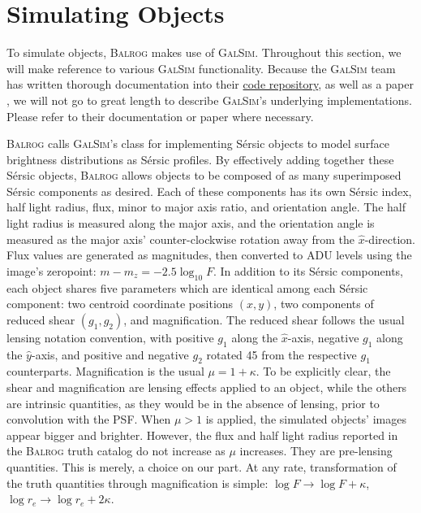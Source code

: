 \documentclass[11pt]{book}
\newcommand{\galsim}{\textsc{GalSim}}
\newcommand{\balrog}{\textsc{Balrog}}
\newcommand{\sersic}{S\'{e}rsic}
\begin{document}


\section{Simulating Objects}
\label{sec:galsim}

To simulate objects, \balrog{} makes use of \galsim{}. 
Throughout this section, we will make reference to various \galsim{} functionality.
Because the \galsim{} team has written thorough documentation into their 
\href{https://github.com/GalSim-developers/GalSim}{code repository},
as well as a paper \citep{galsim}, 
we will not go to great length to describe \galsim{}'s underlying implementations.
Please refer to their documentation or paper where necessary.

\balrog{} calls \galsim{}'s class for implementing \sersic{} objects to model surface brightness distributions as \sersic{} profiles. 
By effectively adding together these \sersic{} objects, \balrog{} allows objects to be composed of as many superimposed
\sersic{} components as desired. Each of these components has its own \sersic{} index, half light radius, flux,
minor to major axis ratio, and orientation angle. The half light radius is measured along
the major axis, and the orientation angle is measured as the major axis' counter-clockwise rotation
away from the $\hat{x}$-direction. 
Flux values are generated as magnitudes, then converted to ADU levels using the image's zeropoint:
$m - m_ z = -2.5 \log_{10} F$.
In addition to its \sersic{} components, each object
shares five parameters which are identical among each \sersic{} component:
two centroid coordinate positions $(x, y)$, two components of reduced shear $(g_1, g_2)$, and magnification.
The reduced shear follows the usual lensing notation convention, with positive $g_1$ along the $\hat{x}$-axis,
negative $g_1$ along the $\hat{y}$-axis, and positive and negative $g_2$ rotated 45\degree{} from the
respective $g_1$ counterparts. Magnification is the usual $\mu = 1 + \kappa$.
To be explicitly clear, the shear and magnification are lensing effects applied to an object,
while the others are intrinsic quantities, as they would be in the absence of lensing, prior to convolution with the PSF.
When $\mu > 1$ is applied, the simulated objects' images appear bigger and brighter.
However, the flux and half light radius reported in the \balrog{} truth catalog do not increase as $\mu$ increases.
They are pre-lensing quantities. This is merely, a choice on our part. 
At any rate, transformation of the truth quantities through magnification is simple: 
$\log F \rightarrow \log F + \kappa$, $\log r_e \rightarrow \log r_e + 2 \kappa$.
\end{document}
